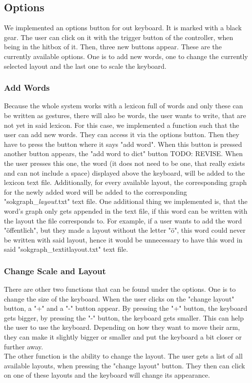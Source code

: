 \subsection{Options}
We implemented an options button for out keyboard. It is marked with a black gear. The user can click on it with the trigger button of the controller, when being in the hitbox of it. Then, three new buttons appear. These are the currently available options. One is to add new words, one to change the currently selected layout and the last one to scale the keyboard.
\subsubsection{Add Words}
Because the whole system works with a lexicon full of words and only these can be written as gestures, there will also be words, the user wants to write, that are not yet in said lexicon. For this case, we implemented a function such that the user can add new words. They can access it via the options button. Then they have to press the button where it says "add word". When this button is pressed another button appears, the "add word to dict" button TODO: REVISE. When the user presses this one, the word (it does not need to be one, that really exists and can not include a space) displayed above the keyboard, will be added to the lexicon text file. Additionally, for every available layout, the corresponding graph for the newly added word will be added to the corresponding "sokgraph\_\textit{layout}.txt" text file. One additional thing we implemented is, that the word's graph only gets appended in the text file, if this word can be written with the layout the file corresponds to. For example, if a user wants to add the word "öffentlich", but they made a layout without the letter "ö", this word could never be written with said layout, hence it would be unnecessary to have this word in said "sokgraph\_textit{layout}.txt" text file.\\

\subsubsection{Change Scale and Layout}
There are other two functions that can be found under the options. One is to change the size of the keyboard. When the user clicks on the "change layout" button, a "+" and a "-" button appear. By pressing the "+" button, the keyboard gets bigger, by pressing the "-" button, the keyboard gets smaller. This can help the user to use the keyboard. Depending on how they want to move their arm, they can make it slightly bigger or smaller and put the keyboard a bit closer or further away.\\
The other function is the ability to change the layout. The user gets a list of all available layouts, when pressing the "change layout" button. They then can click on one of these layouts and the keyboard will change its appearance.

